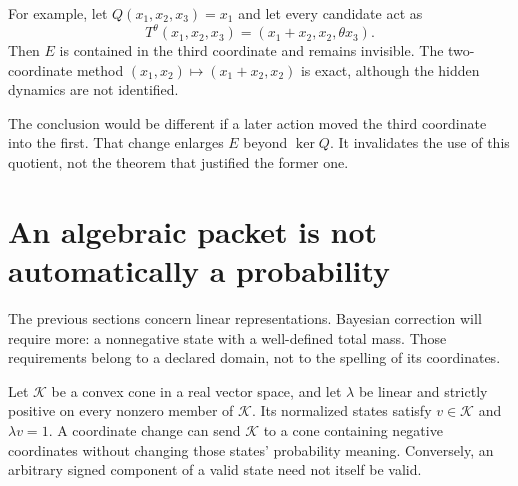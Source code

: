 For example, let $Q(x_1,x_2,x_3)=x_1$ and let every candidate act as
\[
T^\theta(x_1,x_2,x_3)=(x_1+x_2,x_2,\theta x_3).
\]
Then $E$ is contained in the third coordinate and remains invisible. The two-coordinate method $(x_1,x_2)\mapsto(x_1+x_2,x_2)$ is exact, although the hidden dynamics are not identified.

The conclusion would be different if a later action moved the third coordinate into the first. That change enlarges $E$ beyond $\ker Q$. It invalidates the use of this quotient, not the theorem that justified the former one.


\section{An algebraic packet is not automatically a probability}
The previous sections concern linear representations. Bayesian correction will require more: a nonnegative state with a well-defined total mass. Those requirements belong to a declared domain, not to the spelling of its coordinates.

Let $\mathcal K$ be a convex cone in a real vector space, and let $\lambda$ be linear and strictly positive on every nonzero member of $\mathcal K$. Its normalized states satisfy $v\in\mathcal K$ and $\lambda v=1$. A coordinate change can send $\mathcal K$ to a cone containing negative coordinates without changing those states' probability meaning. Conversely, an arbitrary signed component of a valid state need not itself be valid.


